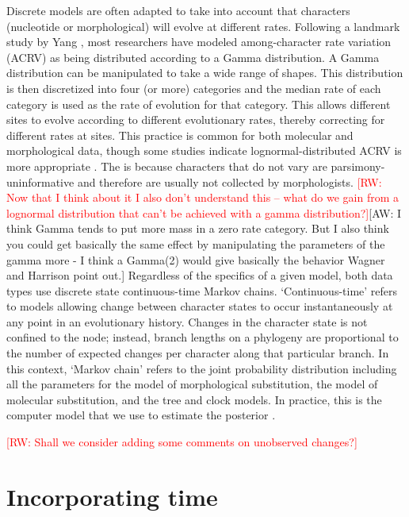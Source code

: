 \documentclass[11pt]{article}
\newcommand{\rw}[1]{{\textcolor{red}{[RW: #1]}}} %
\newcommand{\aw}[1]{{\textcolor{armygreen}{[AW: #1]}}} %
\begin{document}
Discrete models are often adapted to take into account that characters (nucleotide or morphological) will evolve at different rates. Following a landmark study by Yang \cite{Yang1994a}, most researchers have modeled among-character rate variation (ACRV) as being distributed according to a Gamma distribution.
A Gamma distribution can be manipulated to take a wide range of shapes.
This distribution is then discretized into four (or more) categories and the median rate of each category is used as the rate of evolution for that category.
This allows different sites to evolve according to different evolutionary rates, thereby correcting for different rates at sites.
This practice is common for both molecular and morphological data, though some studies indicate lognormal-distributed ACRV is more appropriate \cite{wagner2011, Harrison2015}. The is because characters that do not vary are parsimony-uninformative and therefore are usually not collected by morphologists. \rw{Now that I think about it I also don't understand this -- what do we gain from a lognormal distribution that can't be achieved with a gamma distribution?}\aw{I think  Gamma tends to put more mass in a zero rate category. But I also think you could get basically the same effect by manipulating the parameters of the gamma more - I think a Gamma(2) would give basically the behavior Wagner and Harrison point out.}
Regardless of the specifics of a given model, both data types use discrete state continuous-time Markov chains.
`Continuous-time' refers to models allowing change between character states to occur instantaneously at any point in an evolutionary history.
Changes in the character state is not confined to the node; instead, branch lengths on a phylogeny are proportional to the number of expected changes per character along that particular branch. 
In this context, `Markov chain' refers to the  joint probability distribution including all the parameters for the model of morphological substitution, the model of molecular substitution, and the tree and clock models. 
In practice, this is the computer model that we use to estimate the posterior \cite{Hoehna2016b}.

\rw{Shall we consider adding some comments on unobserved changes?}

\section{Incorporating time} %
\end{document}
